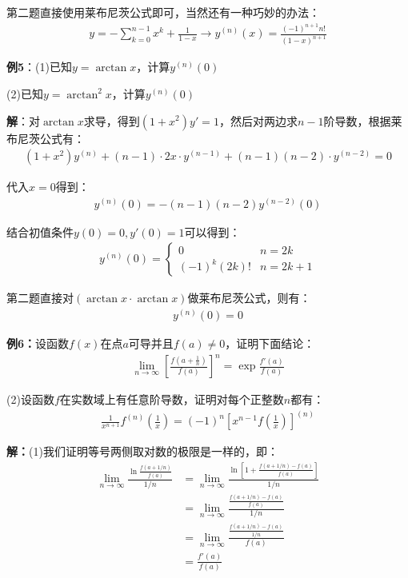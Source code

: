 \documentclass{ctexart}
\let\oldtextbf\textbf %
\renewcommand{\textbf}[1]{\textcolor{btex}{\oldtextbf{#1}}} %
\begin{document}
第二题直接使用莱布尼茨公式即可，当然还有一种巧妙的办法：
\begin{align*}
    y=-\sum_{k=0}^{n-1}x^k+\frac{1}{1-x}\to y^{(n)}(x)=\frac{(-1)^{n+1}n!}{(1-x)^{n+1}}
\end{align*}

\textbf{例5}：(1)已知$y=\arctan x$，计算$y^{(n)}(0)$

(2)已知$y=\arctan^2 x$，计算$y^{(n)}(0)$

\textbf{解}：对$\arctan x$求导，得到$(1+x^2)y'=1$，然后对两边求$n-1$阶导数，根据莱布尼茨公式有：
\begin{align*} 
  (1+x^2)y^{(n)}+(n-1)\cdot 2x\cdot y^{(n-1)}+(n-1)(n-2)\cdot y^{(n-2)}=0
\end{align*}

代入$x=0$得到：
\begin{align*}
    y^{(n)}(0)=-(n-1)(n-2)y^{(n-2)}(0)
\end{align*}

结合初值条件$y(0)=0,y'(0)=1$可以得到：
\begin{align*}
    y^{(n)}(0)=\begin{cases}
        0 & n=2k\\
        (-1)^k(2k)! &n=2k+1
    \end{cases}
\end{align*}

第二题直接对$(\arctan x\cdot \arctan x)$做莱布尼茨公式，则有：
\begin{align*}
    y^{(n)}(0)=0
\end{align*}

\textbf{例6：}设函数$f(x)$在点$a$可导并且$f(a)\neq 0$，证明下面结论：
\begin{align*}
    \lim_{n\to\infty}\left[\frac{f(a+\frac{1}{n})}{f(a)}\right]^n=\exp\frac{f'(a)}{f(a)}
\end{align*}

(2)设函数$f$在实数域上有任意阶导数，证明对每个正整数$n$都有：
\begin{align*}
    \frac{1}{x^{n+1}}f^{(n)}(\frac{1}{x})=(-1)^n[x^{n-1}f(\frac{1}{x})]^{(n)}
\end{align*}

\textbf{解：}(1)我们证明等号两侧取对数的极限是一样的，即：
\begin{align*} 
 \lim_{n\to\infty}\frac{\ln\frac{f(a+1/n)}{f(a)} }{1/n}&=\lim_{n\to\infty}\frac{\ln\left[1+\frac{f(a+1/n)-f(a)}
{f(a)}\right] }{1/n}\\
&= \lim_{n\to\infty}\frac{\frac{f(a+1/n)-f(a)}
{f(a)} }{1/n}\\
&=\lim_{n\to\infty}\frac{\frac{f(a+1/n)-f(a)}
{1/n} }{f(a)}\\
&=\frac{f'(a)}{f(a)} 
\end{align*}
\end{document}
